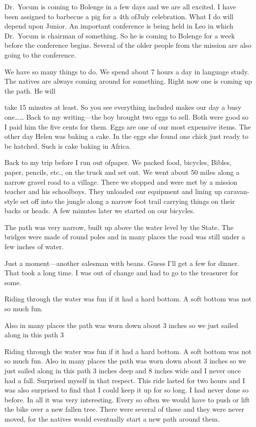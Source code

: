 \documentclass[
]{book}
\begin{document}
Dr.~Yocum is coming to Bolenge in a few days and we are all excited. I have been assigned to barbecue a pig for a 4th ofJuly celebration. What I do will depend upon Junior. An important conference is being held in Leo in which Dr.~Yocum is chairman of something. So he is coming to Bolenge for a week before the conference begins. Several of the older people from the mission are also going to the conference.

We have so many things to do. We spend about 7 hours a day in language study. The natives are always coming around for something. Right now one is coming up the path. He will

take 15 minutes at least. So you see everything included makes our day a busy one\ldots\ldots{} Back to my writing---the boy brought two eggs to sell. Both were good so I paid him the five cents for them. Eggs are one of our most expensive items. The other day Helen was baking a cake. In the eggs she found one chick just ready to be hatched. Such is cake baking in Africa.

Back to my trip before I run out ofpaper. We packed food, bicycles, Bibles, paper, pencils, etc., on the truck and set out. We went about 50 miles along a narrow gravel road to a village. There we stopped and were met by a mission teacher and his schoolboys. They unloaded our equipment and lining up caravan-style set off into the jungle along a narrow foot trail carrying things on their backs or heads. A few minutes later we started on our bicycles.

The path was very narrow, built up above the water level by the State. The bridges were made of round poles and in many places the road was still under a few inches of water.

Just a moment---another salesman with beans. Guess I'll get a few for dinner. That took a long time. I was out of change and had to go to the treasurer for some.

Riding through the water was fun if it had a hard bottom. A soft bottom was not so much fun.

Also in many places the path was worn down about 3 inches so we just sailed along in this path 3

Riding through the water was fun if it had a hard bottom. A soft bottom was not so much fun. Also in many places the path was worn down about 3 inches so we just sailed along in this path 3 inches deep and 8 inches wide and I never once had a fall. Surprised myself in that respect. This ride lasted for two hours and I was also surprised to find that I could keep it up for so long. I had never done so before. In all it was very interesting. Every so often we would have to push or lift the bike over a new fallen tree. There were several of these and they were never moved, for the natives would eventually start a new path around them.
\end{document}
